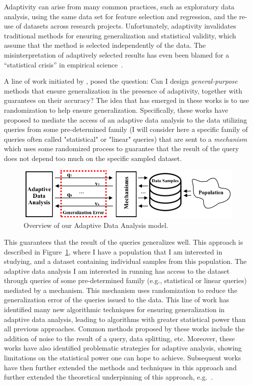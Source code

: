   Adaptivity can arise from many common practices, such as exploratory data analysis, using the same data set for feature selection and regression, and the re-use of datasets across research projects. Unfortunately, adaptivity invalidates traditional methods for ensuring generalization and statistical validity, which assume that the method is selected independently of the data. The misinterpretation of adaptively selected results has even been blamed for a ``statistical crisis'' in empirical science~\cite{GelmanL13}.
 
 A line of work initiated by \cite{DworkFHPRR15}, \cite{HardtU14} posed the question: 
 Can I design \emph{general-purpose} methods that ensure generalization in the presence of adaptivity, together with guarantees on their accuracy? 
 The idea that has emerged in these works is to use randomization to help ensure generalization. 
 Specifically, these works have proposed to mediate the access of an adaptive data analysis to the data utilizing queries from some pre-determined family (I will consider here a specific family of queries often called "statistical" or "linear" queries) that are sent to a 
 \emph{mechanism} which uses some randomized process to guarantee that the result of the query does not depend too much on the specific
 sampled dataset. 
 \begin{figure}
  \centering
  \includegraphics[width=0.7\columnwidth]{figures/data_analysis_model.png}
  \caption{Overview of our Adaptive Data Analysis model.}
  \label{fig:adaptivity-model-overview}
 \vspace{-0.5cm}
 \end{figure}
 This guarantees that the result of the queries generalizes well. 
 This approach is described in Figure~\ref{fig:adaptivity-model-overview}, where
 I have a population that I am interested in studying, and a dataset containing individual samples from this population. The adaptive data analysis I am interested in running has access to the dataset through queries of some pre-determined family (e.g., statistical or linear queries) mediated by a mechanism. 
 This mechanism uses randomization to reduce the generalization error of the queries issued to the data.
 This line of work has identified many new algorithmic techniques for ensuring generalization in adaptive data analysis, leading to algorithms with greater statistical power than all previous approaches. 
 Common methods proposed by these works include the addition of noise to the result of a query, data splitting, etc. 
 Moreover, these works have also identified problematic strategies for adaptive analysis, showing limitations on the statistical power one can hope to achieve. 
 Subsequent works have then further extended the methods and techniques in this approach and further extended the theoretical underpinning of this approach, 
 e.g.~\cite{dwork2015reusable,dwork2015generalization,BassilyNSSSU16,UllmanSNSS18,FeldmanS17,jung2019new,SteinkeZ20,RogersRSSTW20}.
 
